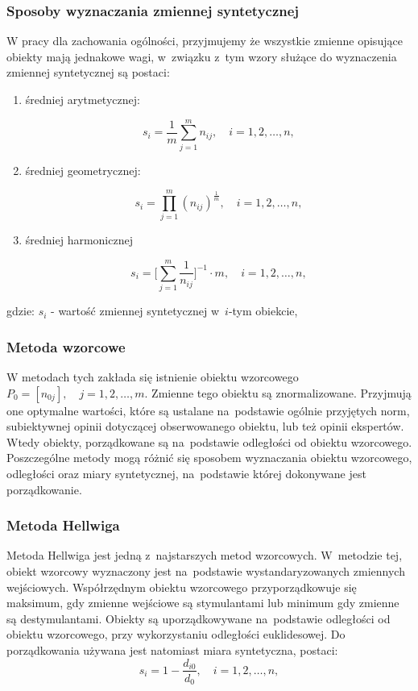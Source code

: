 \documentclass[12pt,a4paper]{report}
\begin{document}
\subsubsection{Sposoby wyznaczania zmiennej syntetycznej}
W pracy dla zachowania ogólności, przyjmujemy że wszystkie zmienne opisujące obiekty mają jednakowe wagi, w~związku z~tym wzory służące do wyznaczenia zmiennej syntetycznej są postaci:
\begin{enumerate}
\item średniej arytmetycznej:

$$
s_{i}=\frac{1}{m} \sum_{j=1}^{m} n_{ij},  \quad i=1, 2, \ldots, n,
$$

\item średniej geometrycznej:

$$
s_{i}=\prod_{j=1}^{m} (n_{ij})^{\frac{1}{m}}, \quad i=1, 2, \ldots, n,
$$

\item średniej harmonicznej

$$
s_{i}=\big[\sum_{j=1}^{m} \frac{1}{n_{ij}}\big]^{-1} \cdot m, \quad i=1, 2, \ldots, n,
$$

\end{enumerate}
gdzie:
$s_{i}$ - wartość zmiennej syntetycznej w~$i$-tym obiekcie,

\subsubsection{Metoda wzorcowe}


W metodach tych zakłada się istnienie obiektu wzorcowego $P_{0}=[n_{0j}], \quad  j= 1,2,\ldots,m$. Zmienne tego obiektu są znormalizowane. Przyjmują one optymalne wartości, które są ustalane na~podstawie ogólnie przyjętych norm, subiektywnej opinii dotyczącej obserwowanego obiektu, lub też opinii ekspertów. Wtedy obiekty, porządkowane są na~podstawie odległości od obiektu wzorcowego. 
Poszczególne metody mogą różnić się sposobem wyznaczania obiektu wzorcowego, odległości oraz miary syntetycznej, na~podstawie której dokonywane jest porządkowanie.

\subsubsection{Metoda Hellwiga}


Metoda Hellwiga jest jedną z~najstarszych metod wzorcowych. W~metodzie tej, obiekt wzorcowy wyznaczony jest na~podstawie wystandaryzowanych zmiennych wejściowych. Współrzędnym obiektu wzorcowego przyporządkowuje się maksimum, gdy zmienne wejściowe są stymulantami lub minimum gdy zmienne są destymulantami. Obiekty są uporządkowywane na~podstawie odległości od obiektu wzorcowego, przy wykorzystaniu odległości euklidesowej.
Do porządkowania używana jest natomiast miara syntetyczna, postaci: 
$$
s_i=1-\frac{d_{i0}}{d_{0}},\quad i=1, 2, \ldots, n ,
$$
\end{document}
